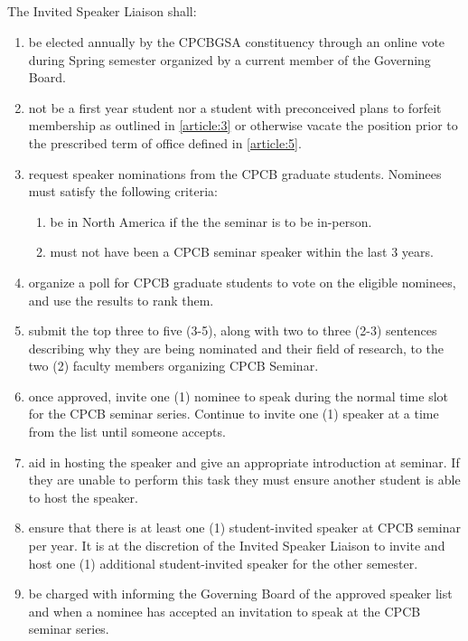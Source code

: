 \documentclass[11pt,a4paper]{article}
\begin{document}
\subsection{} The Invited Speaker Liaison shall:
\begin{enumerate}        
	\item be elected annually by the CPCBGSA constituency through an online vote during Spring semester organized by a current member of the Governing Board. 
	\item not be a first year student nor a student with preconceived plans to forfeit membership as outlined in \cref{article:3} or otherwise vacate the position prior to the prescribed term of office defined in \cref{article:5}. 
	\item request speaker nominations from the CPCB graduate students. Nominees must satisfy the following criteria:
		\begin{enumerate}        
			\item be in North America if the the seminar is to be in-person.
			\item must not have been a CPCB seminar speaker within the last 3 years. 
		\end{enumerate}        
	\item organize a poll for CPCB graduate students to vote on the eligible nominees, and use the results to rank them.
	\item submit the top three to five (3-5), along with two to three (2-3) sentences describing why they are being nominated and their field of research, to the two (2) faculty members organizing CPCB Seminar.
	\item once approved, invite one (1) nominee to speak during the normal time slot for the CPCB seminar series. Continue to invite one (1) speaker at a time from the list until someone accepts. 
	\item aid in hosting the speaker and give an appropriate introduction at seminar. If they are unable to perform this task they must ensure another student is able to host the speaker.
	\item ensure that there is at least one (1) student-invited speaker at CPCB seminar per year. It is at the discretion of the Invited Speaker Liaison to invite and host one (1) additional student-invited speaker for the other semester. 
	\item be charged with informing the Governing Board of the approved speaker list and when a nominee has accepted an invitation to speak at the CPCB seminar series. 
\end{enumerate}        
\end{document}
